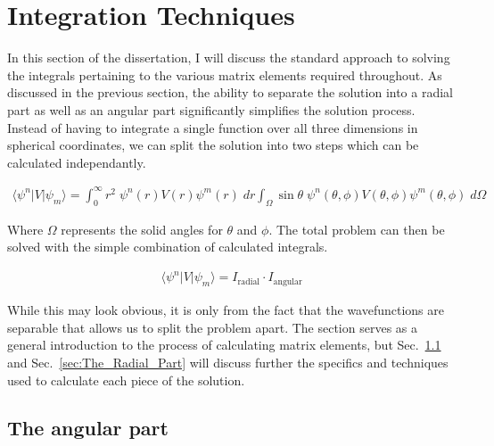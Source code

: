     \section{Integration Techniques} \label{sec:Integration_Techniques}
        In this section of the dissertation, I will discuss the standard approach to solving the integrals pertaining to the various matrix elements required throughout. As discussed in the previous section, the ability to separate the solution into a radial part as well as an angular part significantly simplifies the solution process. Instead of having to integrate a single function over all three dimensions in spherical coordinates, we can split the solution into two steps which can be calculated independantly.

        \begin{align}
            \langle \psi^n \vert V \vert \psi_m \rangle = \int_{0}^{\infty} r^2 \; \psi^n(r) V(r) \psi^m(r) \; dr \int_\Omega \sin \theta \; \psi^n(\theta, \phi) V(\theta, \phi) \psi^m(\theta, \phi) \; d\Omega
        \end{align}

        Where $\Omega$ represents the solid angles for $\theta$ and $\phi$. The total problem can then be solved with the simple combination of calculated integrals.

        \begin{align}
             \langle \psi^n \vert V \vert \psi_m \rangle = I_{\text{radial}} \cdot I_{\text{angular}}
        \end{align}

        While this may look obvious, it is only from the fact that the wavefunctions are separable that allows us to split the problem apart. The section serves as a general introduction to the process of calculating matrix elements, but Sec.~\ref{sec:The_Angular_Part} and Sec.~\ref{sec:The_Radial_Part} will discuss further the specifics and techniques used to calculate each piece of the solution.

        \subsection{The angular part} \label{sec:The_Angular_Part}
